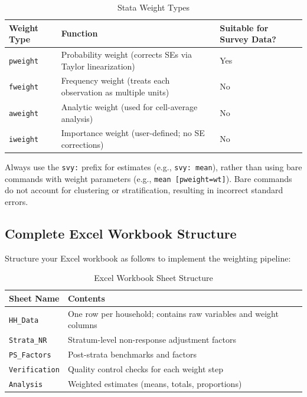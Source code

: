 \documentclass[11pt,a4paper]{article}
\begin{document}
\begin{table}[htbp]
  \centering
  \caption{Stata Weight Types}
  \label{tab:stata_weight_types}
  \begin{tabularx}{\textwidth}{lXl}
    \toprule
    \textbf{Weight Type} & \textbf{Function} & \textbf{Suitable for Survey Data?} \\
    \midrule
    \texttt{pweight} & Probability weight (corrects SEs via Taylor linearization) & Yes \\
    \texttt{fweight} & Frequency weight (treats each observation as multiple units) & No \\
    \texttt{aweight} & Analytic weight (used for cell-average analysis) & No \\
    \texttt{iweight} & Importance weight (user-defined; no SE corrections) & No \\
    \bottomrule
  \end{tabularx}
\end{table}

\begin{keytakeaway}
Always use the \texttt{svy:} prefix for estimates (e.g., \texttt{svy: mean}), rather than using bare commands with weight parameters (e.g., \texttt{mean [pweight=wt]}). Bare commands do not account for clustering or stratification, resulting in incorrect standard errors.
\end{keytakeaway}

\newpage

\subsection{Complete Excel Workbook Structure}
Structure your Excel workbook as follows to implement the weighting pipeline:

\begin{table}[htbp]
  \centering
  \caption{Excel Workbook Sheet Structure}
  \label{tab:excel_workbook_structure}
  \begin{tabularx}{\textwidth}{lX}
    \toprule
    \textbf{Sheet Name} & \textbf{Contents} \\
    \midrule
    \texttt{HH\_Data} & One row per household; contains raw variables and weight columns \\
    \texttt{Strata\_NR} & Stratum-level non-response adjustment factors \\
    \texttt{PS\_Factors} & Post-strata benchmarks and factors \\
    \texttt{Verification} & Quality control checks for each weight step \\
    \texttt{Analysis} & Weighted estimates (means, totals, proportions) \\
    \bottomrule
  \end{tabularx}
\end{table}
\end{document}
